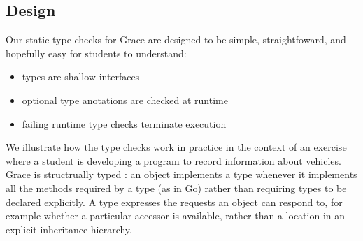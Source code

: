 


\subsection{Design}




Our static type checks for Grace are designed to be simple,
straightfoward, and hopefully easy for students to understand:
\begin{itemize}
  \item types are shallow interfaces
  \item optional type anotations are checked at runtime
  \item failing runtime type checks terminate execution
\end{itemize}


We illustrate how the type checks work in practice
in the context of an exercise where a student is developing
a program to record information about vehicles.
%
Grace is structrually typed \cite{graceOnward12}:
an object implements a type whenever it
implements all the methods required by a 
type (as in Go) rather than requiring types to be declared
explicitly. 
A type expresses the requests
an object can respond to, for example whether a particular accessor is
available,  rather than a location in an explicit inheritance
hierarchy.

